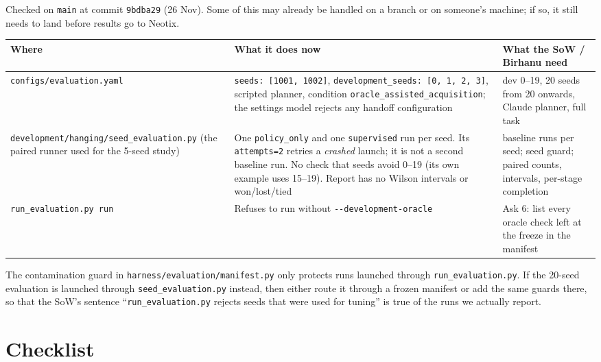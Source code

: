 \documentclass[11pt,a4paper]{article}
\newcommand{\tool}[1]{\texttt{\small #1}}
\begin{document}
Checked on \texttt{main} at commit \tool{9bdba29} (26 Nov). Some of this may already be handled on a branch or on
someone's machine; if so, it still needs to land before results go to Neotix.

\begin{center}\small
\begin{tabularx}{\linewidth}{@{}>{\raggedright\arraybackslash}p{4.3cm} >{\raggedright\arraybackslash}X >{\raggedright\arraybackslash}p{3.4cm}@{}}
\toprule
Where & What it does now & What the SoW / Birhanu need\\
\midrule
\tool{configs/\allowbreak evaluation.yaml} & \tool{seeds: [1001, 1002]}, \tool{development\_seeds: [0, 1, 2, 3]}, scripted planner, condition \tool{oracle\_assisted\_acquisition}; the settings model rejects any handoff configuration & dev 0--19, 20 seeds from 20 onwards, Claude planner, full task\\
\tool{development/hanging/\allowbreak seed\_evaluation.py} (the paired runner used for the 5-seed study) & One \tool{policy\_only} and one \tool{supervised} run per seed. Its \tool{attempts=2} retries a \emph{crashed} launch; it is not a second baseline run. No check that seeds avoid 0--19 (its own example uses 15--19). Report has no Wilson intervals or won/lost/tied & 2 baseline runs per seed; seed guard; paired counts, intervals, per-stage completion\\
\tool{run\_evaluation.py run} & Refuses to run without \tool{-{}-development-oracle} & Ask 6: list every oracle check left at the freeze in the manifest\\
\bottomrule
\end{tabularx}
\end{center}

\begin{incode}
The contamination guard in \tool{harness/evaluation/manifest.py} only protects runs launched through
\tool{run\_evaluation.py}. If the 20-seed evaluation is launched through \tool{seed\_evaluation.py} instead, then
either route it through a frozen manifest or add the same guards there, so that the SoW's sentence ``\tool{run\_evaluation.py}
rejects seeds that were used for tuning'' is true of the runs we actually report.
\end{incode}

\section{Checklist}\label{sec:checklist}
\end{document}
